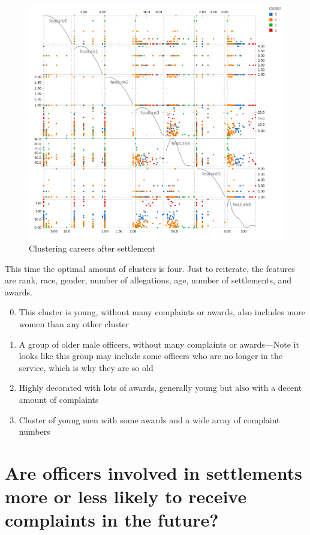 \documentclass{article}
\begin{document}
\begin{figure}[h!]
\centering
\caption{Clustering careers after settlement}
\includegraphics[width=\textwidth]{cluster2.png}
\end{figure}

This time the optimal amount of clusters is four. Just to reiterate, the features are rank, race, gender, number of allegations, age, number of settlements, and awards.
\begin{enumerate}
\setcounter{enumi}{-1}
\item{This cluster is young, without many complaints or awards, also includes more women than any other cluster}
\item{A group of older male officers, without many complaints or awards---Note it looks like this group may include some officers who are no longer in the service, which is why they are so old}
\item{Highly decorated with lots of awards, generally young but also with a decent amount of complaints}
\item{Cluster of young men with some awards and a wide array of complaint numbers}
\end{enumerate}


\section{Are officers involved in settlements more or less likely to receive complaints in the future?}
\end{document}
